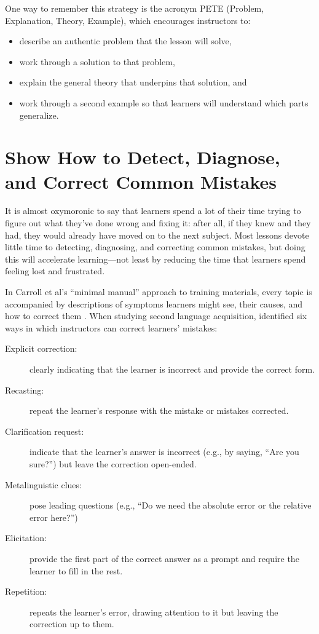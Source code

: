 \documentclass[10pt,letterpaper]{article}
\newcommand{\rulemajor}[1]{\section{#1}}
\begin{document}
One way to remember this strategy is the acronym PETE (Problem, Explanation,
Theory, Example), which encourages instructors to:

\begin{itemize}

\item describe an authentic problem that the lesson will solve,

\item work through a solution to that problem,

\item explain the general theory that underpins that solution, and

\item work through a second example so that learners will understand which parts
  generalize.

\end{itemize}

\rulemajor{Show How to Detect, Diagnose, and Correct Common Mistakes}

It is almost oxymoronic to say that learners spend a lot of their time trying to
figure out what they've done wrong and fixing it: after all, if they knew and
they had, they would already have moved on to the next subject.  Most lessons
devote little time to detecting, diagnosing, and correcting common mistakes, but
doing this will accelerate learning---not least by reducing the time that
learners spend feeling lost and frustrated.

In Carroll et al's ``minimal manual'' approach to training materials, every
topic is accompanied by descriptions of symptoms learners might see, their
causes, and how to correct them \cite{Carr2014}.  When studying second language
acquisition, \cite{Lyst1997} identified six ways in which instructors can
correct learners' mistakes:

\begin{description}

\item[Explicit correction:] clearly indicating that the learner is incorrect and
  provide the correct form.

\item[Recasting:] repeat the learner's response with the mistake or mistakes
  corrected.

\item[Clarification request:] indicate that the learner's answer is incorrect
  (e.g., by saying, ``Are you sure?'') but leave the correction open-ended.

\item[Metalinguistic clues:] pose leading questions (e.g., ``Do we need the
  absolute error or the relative error here?'')

\item[Elicitation:] provide the first part of the correct answer as a prompt and
  require the learner to fill in the rest.

\item[Repetition:] repeats the learner's error, drawing attention to it but
  leaving the correction up to them.

\end{description}
\end{document}
